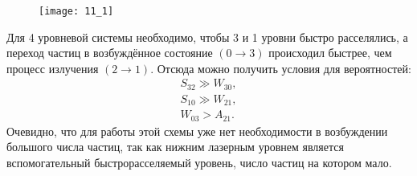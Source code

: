 
\begin{figure}[h]
\begin{center}
    \texttt{[image: 11\_1]}
\end{center}
\end{figure}

Для 4 уровневой системы необходимо, чтобы 3 и 1 уровни быстро расселялись, а
переход частиц в возбуждённое состояние \( (0\to3) \) происходил быстрее, чем
процесс излучения \( (2\to1) \). Отсюда можно получить условия для вероятностей:
\begin{gather*}
    S_{32}\gg W_{30},\\
    S_{10}\gg W_{21},\\
    W_{03} > A_{21}.
\end{gather*}
Очевидно, что для работы этой схемы уже нет необходимости в возбуждении большого
числа частиц, так как нижним лазерным уровнем является вспомогательный
быстрорасселяемый уровень, число частиц на котором мало.
